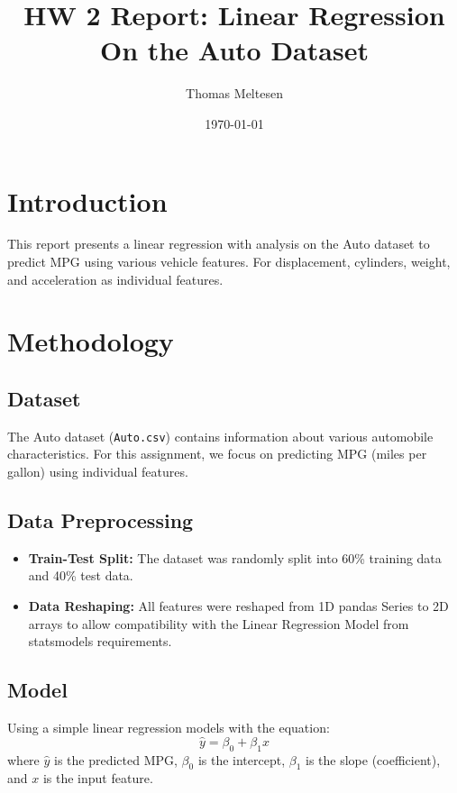 \documentclass[12pt]{article}
\title{HW 2 Report: Linear Regression\\
On the Auto Dataset}
\author {Thomas Meltesen}
\date{\today}
\begin{document}
\maketitle

\section{Introduction}
This report presents a linear regression with analysis on the Auto dataset to predict MPG using various vehicle features. For displacement, cylinders, weight, and acceleration as individual features.

\section{Methodology}

\subsection{Dataset}
The Auto dataset (\texttt{Auto.csv}) contains information about various automobile characteristics. For this assignment, we focus on predicting MPG (miles per gallon) using individual features.

\subsection{Data Preprocessing}
\begin{itemize}
    \item \textbf{Train-Test Split:} The dataset was randomly split into 60\% training data and 40\% test data.
    \item \textbf{Data Reshaping:} All features were reshaped from 1D pandas Series to 2D arrays to allow compatibility with the Linear Regression Model from statsmodels requirements.
\end{itemize}

\subsection{Model}
Using a simple linear regression models with the equation:
\begin{equation}
    \hat{y} = \beta_0 + \beta_1 x
\end{equation}
where $\hat{y}$ is the predicted MPG, $\beta_0$ is the intercept, $\beta_1$ is the slope (coefficient), and $x$ is the input feature.
\end{document}

